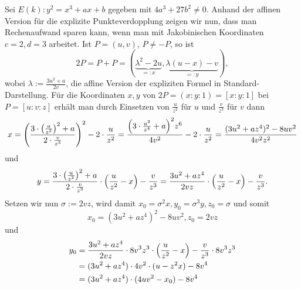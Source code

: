 \begin{anw}
	Sei $E(k)\colon y^2 = x^3 + ax + b$ gegeben mit $4a^3 + 27b^2 \neq 0$.
	Anhand der affinen Version für die explizite Punkteverdopplung zeigen wir nun, dass man Rechenaufwand sparen kann, wenn man mit Jakobinischen Koordinaten $c=2, d=3$ arbeitet.
	Ist $P = (u,v)$, $P \neq -P$, so ist
	\[
		2P = P+P =  (\underbrace{\lambda^2 - 2u}_{=:x}, \underbrace{\lambda(u-x) - v}_{=:y}),
	\]
	wobei $\lambda := \frac{3u^2+a}{2v}$, die affine Version der expliziten Formel in Standard-Darstellung.
	Für die Koordinaten $x,y$ von $2P = (x:y:1) = [x:y:1]$ bei $P=[u:v:z]$ erhält man durch Einsetzen von $\frac{u}{z^2}$ für $u$ und $\frac{v}{z^3}$ für $v$ dann
	\[
		x = \enb{\frac{3 \cdot \enb{ \frac{u}{z^2} }^2 + a}{2 \cdot \frac{v}{z^3}}}^2 - 2 \cdot \frac{u}{z^2} = \frac{\enb{3 \cdot \frac{u^2}{z^4} + a}^2 z^6}{4v^2} - 2 \cdot \frac{u}{z^2} = \frac{(3u^2 + az^4)^2-8uv^2}{4v^2z^2}
	\]
	und
	\[
		y = \frac{3 \cdot \left( \frac{u}{z^2}\right)^2 + a}{2 \cdot \frac{v}{z^3}} \cdot \left(\frac{u}{z^2} - x\right) - \frac{v}{z^3} = \frac{3u^2 + az^4}{2vz} \cdot \left(\frac{u}{z^2} - x\right) - \frac{v}{z^3}.
	\]
	Setzen wir nun $\sigma := 2vz$, wird damit $x_0 = \sigma^2 x, y_0 = \sigma^3 y, z_0 = \sigma$ und somit
	\[
		x_0 = (3u^2+az^4)^2 - 8uv^2, z_0 = 2vz
	\]
	und
	\begin{equation}
	\begin{aligned}
		y_0 &= \frac{3u^2+az^4}{2vz} \cdot 8v^3z^3 \cdot \left(\frac{u}{z^2} - x\right) - \frac{v}{z^3} \cdot 8v^3z^3 \\
		&= (3u^2 + az^4) \cdot 4v^2 \cdot(u-z^2x) - 8v^4 \\
		&= (3u^2 + az^4) \cdot (4uv^2 - x_0) - 8v^4
	\end{aligned}
	\end{equation}
\end{anw}
\newpage
